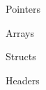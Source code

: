 \documentclass[pdf]{beamer}
\begin{document}
\begin{frame}{Pointers}

\end{frame}

\begin{frame}{Arrays}

\end{frame}

\begin{frame}{Structs}

\end{frame}

\begin{frame}{Headers}

\end{frame}
\end{document}
